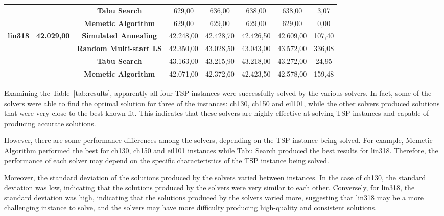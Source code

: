 \documentclass[conference]{IEEEtran}
\begin{document}
\begin{table}[H]
{\begin{tabular}{|c|c|c|c|c|c|c|c|}
			&                                     & \textbf{Tabu Search}           & 629,00    & 636,00    & 638,00    & 638,00    & 3,07   \\ \cline{3-8} 
			&                                     & \textbf{Memetic Algorithm}     & 629,00    & 629,00    & 629,00    & 629,00    & 0,00   \\ \hline
			\multirow{4}{*}{\textbf{lin318}} & \multirow{4}{*}{\textbf{42.029,00}} & \textbf{Simulated Annealing}   & 42.248,00 & 42.428,70 & 42.426,50 & 42.609,00 & 107,40 \\ \cline{3-8} 
			&                                     & \textbf{Random Multi-start LS} & 42.350,00 & 43.028,50 & 43.043,00 & 43.572,00 & 336,08 \\ \cline{3-8} 
			&                                     & \textbf{Tabu Search}           & 43.163,00 & 43.215,90 & 43.218,00 & 43.272,00 & 24,95  \\ \cline{3-8} 
			&                                     & \textbf{Memetic Algorithm}     & 42.071,00 & 42.372,60 & 42.423,50 & 42.578,00 & 159,48 \\ \hline
		\end{tabular}%
	}
\end{table}

Examining the Table~\ref{tab:results}, apparently all four TSP instances were successfully solved by the various solvers. In fact, some of the solvers were able to find the optimal solution for three of the instances: ch130, ch150 and eil101, while the other solvers produced solutions that were very close to the best known fit. This indicates that these solvers are highly effective at solving TSP instances and capable of producing accurate solutions.

However, there are some performance differences among the solvers, depending on the TSP instance being solved. For example, Memetic Algorithm performed the best for ch130, ch150 and eil101 instances while Tabu Search produced the best results for lin318. Therefore, the performance of each solver may depend on the specific characteristics of the TSP instance being solved.

Moreover, the standard deviation of the solutions produced by the solvers varied between instances. In the case of ch130, the standard deviation was low, indicating that the solutions produced by the solvers were very similar to each other. Conversely, for lin318, the standard deviation was high, indicating that the solutions produced by the solvers varied more, suggesting that lin318 may be a more challenging instance to solve, and the solvers may have more difficulty producing high-quality and consistent solutions.
\end{document}
